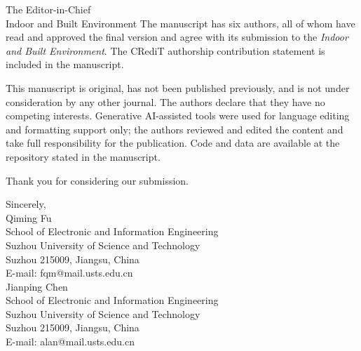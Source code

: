 \documentclass[11pt]{letter}
\begin{document}
\begin{letter}{The Editor-in-Chief\\Indoor and Built Environment}
The manuscript has six authors, all of whom have read and approved the final version and agree with its submission to the \textit{Indoor and Built Environment}. The CRediT authorship contribution statement is included in the manuscript.

This manuscript is original, has not been published previously, and is not under consideration by any other journal. The authors declare that they have no competing interests. Generative AI-assisted tools were used for language editing and formatting support only; the authors reviewed and edited the content and take full responsibility for the publication. Code and data are available at the repository stated in the manuscript.

Thank you for considering our submission.

\vspace{2\baselineskip}
\noindent Sincerely,\\[2\baselineskip]
Qiming Fu\\
School of Electronic and Information Engineering\\
Suzhou University of Science and Technology\\
Suzhou 215009, Jiangsu, China\\
E-mail: fqm@mail.usts.edu.cn\\[1\baselineskip]
Jianping Chen\\
School of Electronic and Information Engineering\\
Suzhou University of Science and Technology\\
Suzhou 215009, Jiangsu, China\\
E-mail: alan@mail.usts.edu.cn

\end{letter}
\end{document}
